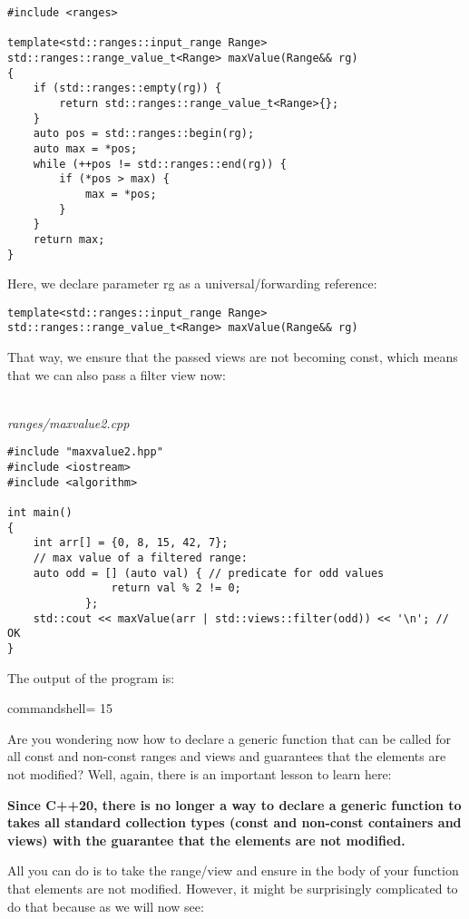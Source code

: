 \begin{lstlisting}[style=styleCXX]
#include <ranges>

template<std::ranges::input_range Range>
std::ranges::range_value_t<Range> maxValue(Range&& rg)
{
	if (std::ranges::empty(rg)) {
		return std::ranges::range_value_t<Range>{};
	}
	auto pos = std::ranges::begin(rg);
	auto max = *pos;
	while (++pos != std::ranges::end(rg)) {
		if (*pos > max) {
			max = *pos;
		}
	}
	return max;
}
\end{lstlisting}

Here, we declare parameter rg as a universal/forwarding reference:

\begin{lstlisting}[style=styleCXX]
template<std::ranges::input_range Range>
std::ranges::range_value_t<Range> maxValue(Range&& rg)
\end{lstlisting}

That way, we ensure that the passed views are not becoming const, which means that we can also pass a filter view now:

\noindent
\hspace*{\fill} \\ %
\textit{ranges/maxvalue2.cpp}

\begin{lstlisting}[style=styleCXX]
#include "maxvalue2.hpp"
#include <iostream>
#include <algorithm>

int main()
{
	int arr[] = {0, 8, 15, 42, 7};
	// max value of a filtered range:
	auto odd = [] (auto val) { // predicate for odd values
				return val % 2 != 0;
			};
	std::cout << maxValue(arr | std::views::filter(odd)) << '\n'; // OK
}
\end{lstlisting}

The output of the program is:

{\footnotesize
\begin{tcblisting}{commandshell={}}
15
\end{tcblisting}
}

Are you wondering now how to declare a generic function that can be called for all const and non-const ranges and views and guarantees that the elements are not modified? Well, again, there is an important lesson to learn here:

\textbf{Since C++20, there is no longer a way to declare a generic function to takes all standard collection types (const and non-const containers and views) with the guarantee that the elements are not modified.}

All you can do is to take the range/view and ensure in the body of your function that elements are not modified. However, it might be surprisingly complicated to do that because as we will now see:

